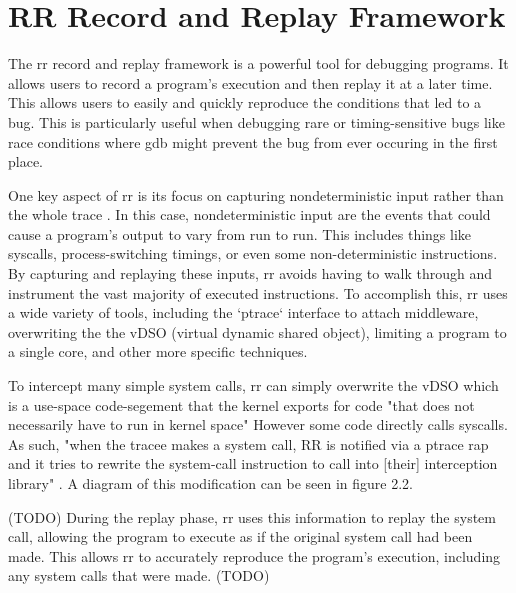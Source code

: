 \section{RR Record and Replay Framework}
The rr record and replay framework is a powerful tool for debugging programs. It allows users to record a program's execution and then replay it at a later time. This allows users to easily and quickly reproduce the conditions that led to a bug. This is particularly useful when debugging rare or timing-sensitive bugs like race conditions where gdb might prevent the bug from ever occuring in the first place.

One key aspect of rr is its focus on capturing nondeterministic input rather than the whole trace \cite{rr-site}. In this case, nondeterministic input are the events that could cause a program's output to vary from run to run. This includes things like syscalls, process-switching timings, or even some non-deterministic instructions. By capturing and replaying these inputs, rr avoids having to walk through and instrument the vast majority of executed instructions. To accomplish this, rr uses a wide variety of tools, including the `ptrace` interface to attach middleware, overwriting the the vDSO (virtual dynamic shared object), limiting a program to a single core, and other more specific techniques. 

To intercept many simple system calls, rr can simply overwrite the vDSO which is a use-space code-segement that the kernel exports for code "that does not necessarily have to run in kernel space" \cite{vdso} However some code directly calls syscalls. As such, "when the tracee makes a system call, RR is notified via a ptrace rap and it tries to rewrite the system-call instruction to call into [their] interception library" \cite[p.~8]{rr}. A diagram of this modification can be seen in figure 2.2. 

(TODO)
During the replay phase, rr uses this information to replay the system call, allowing the program to execute as if the original system call had been made. This allows rr to accurately reproduce the program's execution, including any system calls that were made. 
(TODO)

